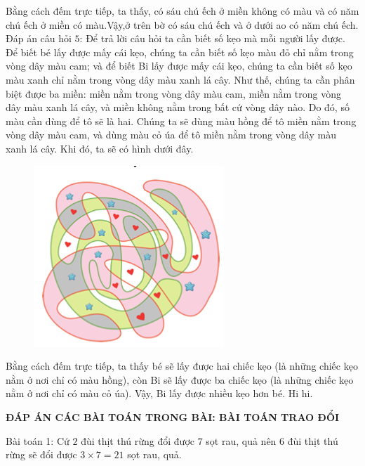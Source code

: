 Bằng cách đếm trực tiếp, ta thấy, có sáu chú ếch ở miền không có màu và có năm chú ếch ở miền có màu.Vậy,ở trên bờ có sáu chú ếch và ở dưới ao có năm chú ếch. 
\vskip 0.1cm
Đáp án câu hỏi $5$:
\vskip 0.1cm
Để trả lời câu hỏi ta cần biết số kẹo mà mỗi người lấy được. Để biết bé lấy được mấy cái kẹo, chúng ta cần biết số kẹo màu đỏ chỉ nằm trong vòng dây màu cam; và để biết Bi lấy được mấy cái kẹo, chúng ta cần biết số kẹo màu xanh chỉ nằm trong vòng dây màu xanh lá cây. 
\vskip 0.1cm
Như thế, chúng ta cần phân biệt được ba miền: miền nằm trong vòng dây màu cam, miền nằm trong vòng dây màu xanh lá cây, và miền không nằm trong bất cứ vòng dây nào. Do đó, số màu cần dùng để tô sẽ là hai. Chúng ta sẽ dùng màu hồng để tô miền nằm trong vòng dây màu cam, và dùng màu cỏ úa để tô miền nằm trong vòng dây màu xanh lá cây. Khi đó, ta sẽ có hình dưới đây. 
\begin{figure}[H]
	\centering
	\vspace*{-5pt}
	\captionsetup{labelformat= empty, justification=centering}
	\includegraphics[width=0.4\linewidth]{2}
	\vspace*{-15pt}
\end{figure}
Bằng cách đếm trực tiếp, ta thấy bé sẽ lấy được hai chiếc kẹo (là những chiếc kẹo nằm ở nơi chỉ có màu hồng), còn Bi sẽ lấy được ba chiếc kẹo (là những chiếc kẹo nằm ở nơi chỉ có màu cỏ úa). Vậy, Bi lấy được nhiều kẹo hơn bé. Hi hi. 
\newpage
\begin{center}
	\textbf{ĐÁP ÁN CÁC BÀI TOÁN TRONG BÀI: BÀI TOÁN TRAO ĐỔI}
\end{center}
Bài toán 1: Cứ $2$ đùi thịt thú rừng đổi được $7$ sọt rau, quả nên $6$ đùi thịt thú rừng sẽ đổi được $3\times 7=21$ sọt rau, quả.%

